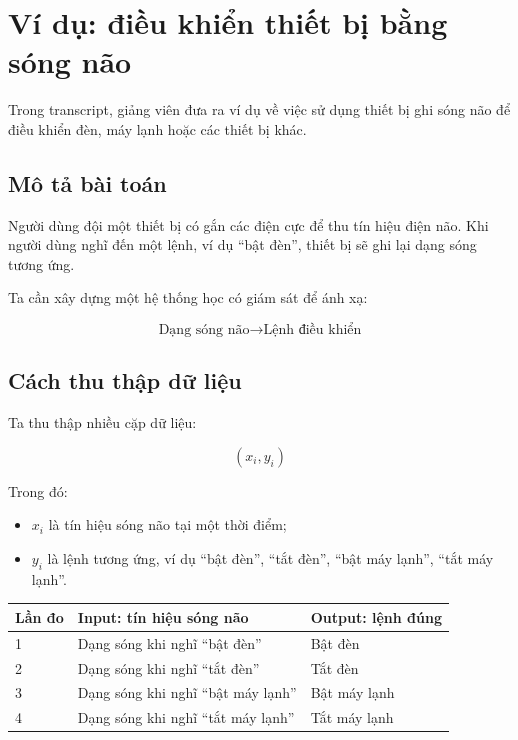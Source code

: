 \documentclass[12pt,a4paper]{report}
\begin{document}
\section{Ví dụ: điều khiển thiết bị bằng sóng não}

Trong transcript, giảng viên đưa ra ví dụ về việc sử dụng thiết bị ghi sóng não để điều khiển đèn, máy lạnh hoặc các thiết bị khác.

\subsection{Mô tả bài toán}

Người dùng đội một thiết bị có gắn các điện cực để thu tín hiệu điện não. Khi người dùng nghĩ đến một lệnh, ví dụ ``bật đèn'', thiết bị sẽ ghi lại dạng sóng tương ứng.

Ta cần xây dựng một hệ thống học có giám sát để ánh xạ:

\[
    \text{Dạng sóng não} \longrightarrow \text{Lệnh điều khiển}
\]

\subsection{Cách thu thập dữ liệu}

Ta thu thập nhiều cặp dữ liệu:

\[
    (x_i, y_i)
\]

Trong đó:

\begin{itemize}
    \item $x_i$ là tín hiệu sóng não tại một thời điểm;
    \item $y_i$ là lệnh tương ứng, ví dụ ``bật đèn'', ``tắt đèn'', ``bật máy lạnh'', ``tắt máy lạnh''.
\end{itemize}

\begin{center}
\begin{tabular}{lll}
\toprule
Lần đo & Input: tín hiệu sóng não & Output: lệnh đúng \\
\midrule
1 & Dạng sóng khi nghĩ ``bật đèn'' & Bật đèn \\
2 & Dạng sóng khi nghĩ ``tắt đèn'' & Tắt đèn \\
3 & Dạng sóng khi nghĩ ``bật máy lạnh'' & Bật máy lạnh \\
4 & Dạng sóng khi nghĩ ``tắt máy lạnh'' & Tắt máy lạnh \\
\bottomrule
\end{tabular}
\end{center}
\end{document}
